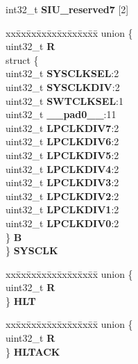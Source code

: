 \begin{DoxyCompactItemize}
\begin{tabbing}
\end{tabbing}\item 
\mbox{\label{structSIU__tag_a6dc00ab6265fadb440fb294496d789c2}} 
int32\+\_\+t {\bfseries S\+I\+U\+\_\+reserved7} \mbox{[}2\mbox{]}
\item 
\mbox{\label{structSIU__tag_a8a88b2b31af487b206376c99f254a79a}} 
\begin{tabbing}
xx\=xx\=xx\=xx\=xx\=xx\=xx\=xx\=xx\=\kill
union \{\\
\>uint32\_t {\bfseries R}\\
\>struct \{\\
\>\>uint32\_t {\bfseries SYSCLKSEL}:2\\
\>\>uint32\_t {\bfseries SYSCLKDIV}:2\\
\>\>uint32\_t {\bfseries SWTCLKSEL}:1\\
\>\>uint32\_t {\bfseries \_\_pad0\_\_}:11\\
\>\>uint32\_t {\bfseries LPCLKDIV7}:2\\
\>\>uint32\_t {\bfseries LPCLKDIV6}:2\\
\>\>uint32\_t {\bfseries LPCLKDIV5}:2\\
\>\>uint32\_t {\bfseries LPCLKDIV4}:2\\
\>\>uint32\_t {\bfseries LPCLKDIV3}:2\\
\>\>uint32\_t {\bfseries LPCLKDIV2}:2\\
\>\>uint32\_t {\bfseries LPCLKDIV1}:2\\
\>\>uint32\_t {\bfseries LPCLKDIV0}:2\\
\>\} {\bfseries B}\\
\} {\bfseries SYSCLK}\\

\end{tabbing}\item 
\mbox{\label{structSIU__tag_a982983989bd356e27034c9316ec8a5a8}} 
\begin{tabbing}
xx\=xx\=xx\=xx\=xx\=xx\=xx\=xx\=xx\=\kill
union \{\\
\>uint32\_t {\bfseries R}\\
\} {\bfseries HLT}\\

\end{tabbing}\item 
\mbox{\label{structSIU__tag_ab67b5127df2f561010fa4d61a9868b69}} 
\begin{tabbing}
xx\=xx\=xx\=xx\=xx\=xx\=xx\=xx\=xx\=\kill
union \{\\
\>uint32\_t {\bfseries R}\\
\} {\bfseries HLTACK}\\


\end{tabbing}
\end{DoxyCompactItemize}
